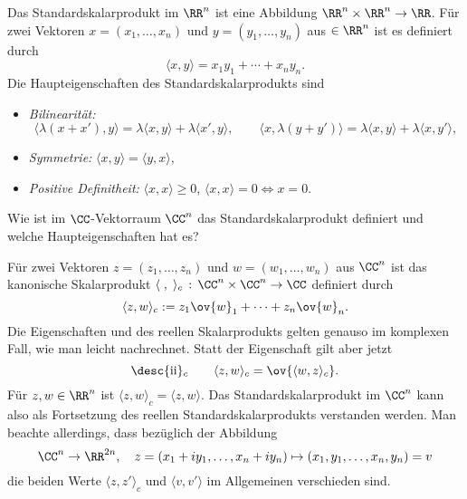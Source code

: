 \begin{antwort}
  Das Standardskalarprodukt im $\RR^n$ ist eine Abbildung $\RR^n\times \RR^n\to\RR$. 
  Für zwei Vektoren $x=(x_1,\ldots, x_n)$ und 
  $y=(y_1,\ldots,y_n)$ aus $\in \RR^n$ ist es definiert 
  durch
  \[
  \langle x,y \rangle = x_1y_1 + \cdots + x_n y_n.
  \]
  Die Haupteigenschaften des Standardskalarprodukts sind
  {\setlength{\labelsep}{5mm}
    \begin{itemize}[3mm]
    \item[\desc{i}] \textit{Bilinearität:}
      \[
      \langle \lambda(x+x'), y \rangle 
      = \lambda \langle x,y \rangle 
      + \lambda \langle x',y \rangle, \qquad
      \langle x, \lambda(y+y') \rangle 
      = \lambda \langle x,y \rangle 
      + \lambda \langle x,y' \rangle, 
      \]
    \item[\desc{ii}] \textit{Symmetrie:}\quad 
      $\langle x,y \rangle = \langle y,x \rangle$,\\[-3.5mm]
    \item[\desc{iii}] \textit{Positive Definitheit:}\quad 
      $\langle x,x \rangle \ge 0$, \quad 
      $\langle x,x \rangle =0 \Longleftrightarrow x=0$.
      \AntEnd
    \end{itemize}}
\end{antwort}






\begin{frage}
  \label{skalarCC}
  Wie ist im $\CC$-Vektorraum $\CC^n$ das Standardskalarprodukt definiert 
  und welche Haupteigenschaften hat es?
\end{frage}

\begin{antwort}
  Für zwei Vektoren $z=(z_1,\ldots,z_n)$ und $w=(w_1,\ldots,w_n)$ aus 
  $\CC^n$ ist das kanonische Skalarprodukt 
  $\langle\;,\;\rangle_c\, : \, \CC^n \times \CC^n \to \CC$ definiert durch 
  \[
  \langle z,w \rangle_c := z_1\ov{w}_1 + \cdots + z_n \ov{w}_n.
  \]
  Die Eigenschaften  und  des reellen Skalarprodukts gelten 
  genauso im komplexen 
  Fall, wie man leicht nachrechnet. Statt der Eigenschaft  gilt 
  aber jetzt
  \[
  \text{\desc{ii}$_c$} \quad \quad\langle z, w 
  \rangle_c = \ov{\langle w,z \rangle_c}.
  \]
  Für $z,w \in \RR^n$ ist $\langle z, w \rangle_c = \langle z, w \rangle$. 
  Das Standardskalarprodukt im $\CC^n$ kann also als Fortsetzung des 
  reellen Standardskalarprodukts verstanden werden. 
  Man beachte allerdings, dass bezüglich der Abbildung
  \[
  \CC^n \to \RR^{2n}, \quad z=(x_1+iy_1,\ldots, x_n+iy_n) 
  \mapsto (x_1,y_1,\ldots,x_n,y_n) = v
  \]
  die beiden Werte $\langle z, z'\rangle_c$ und $\langle v, v' \rangle$ 
  im Allgemeinen verschieden sind.
  \AntEnd
\end{antwort}






